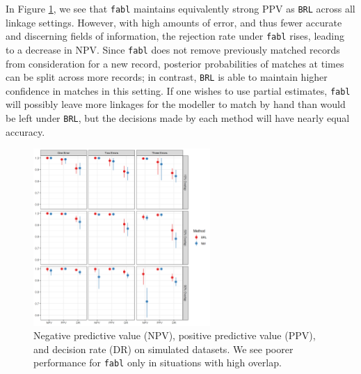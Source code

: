 \documentclass[ba]{imsart}
\begin{document}
	In Figure \ref{fig:sadinle_simulation_partial}, we see that \texttt{fabl} maintains equivalently strong PPV as \texttt{BRL} across all linkage settings. However, with high amounts of error, and thus fewer accurate and discerning fields of information, the rejection rate under \texttt{fabl} rises, leading to a decrease in NPV. Since \texttt{fabl} does not remove previously matched records from consideration for a new record, posterior probabilities of matches at times can be split across more records; in contrast, \texttt{BRL} is able to maintain higher confidence in matches in this setting. If one wishes to use partial estimates, \texttt{fabl} will possibly leave more linkages for the modeller to match by hand than would be left under \texttt{BRL}, but the decisions made by each method will have nearly equal accuracy. 
	
	
	
	\begin{figure}[t]
		\begin{center}
			\includegraphics[width=0.6\textwidth]{../notes/figures/sadinle_sim_plot_partial_DR} 
			\caption{Negative predictive value (NPV), positive predictive value (PPV), and decision rate (DR) on simulated datasets. We see poorer performance for \texttt{fabl} only in situations with high overlap.}
			\label{fig:sadinle_simulation_partial}
		\end{center}
	\end{figure}
\end{document}
